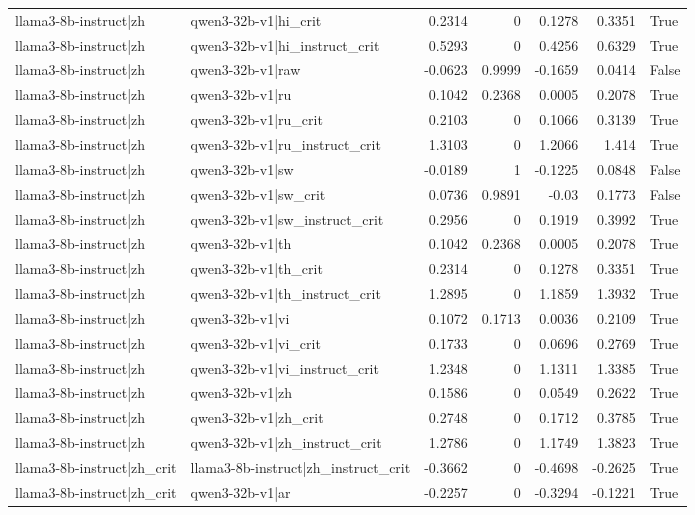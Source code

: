 \begin{table}
\begin{tabular}{l l r r r r l}
llama3-8b-instruct|zh & qwen3-32b-v1|hi_crit & 0.2314 & 0 & 0.1278 & 0.3351 & True \\
llama3-8b-instruct|zh & qwen3-32b-v1|hi_instruct_crit & 0.5293 & 0 & 0.4256 & 0.6329 & True \\
llama3-8b-instruct|zh & qwen3-32b-v1|raw & -0.0623 & 0.9999 & -0.1659 & 0.0414 & False \\
llama3-8b-instruct|zh & qwen3-32b-v1|ru & 0.1042 & 0.2368 & 0.0005 & 0.2078 & True \\
llama3-8b-instruct|zh & qwen3-32b-v1|ru_crit & 0.2103 & 0 & 0.1066 & 0.3139 & True \\
llama3-8b-instruct|zh & qwen3-32b-v1|ru_instruct_crit & 1.3103 & 0 & 1.2066 & 1.414 & True \\
llama3-8b-instruct|zh & qwen3-32b-v1|sw & -0.0189 & 1 & -0.1225 & 0.0848 & False \\
llama3-8b-instruct|zh & qwen3-32b-v1|sw_crit & 0.0736 & 0.9891 & -0.03 & 0.1773 & False \\
llama3-8b-instruct|zh & qwen3-32b-v1|sw_instruct_crit & 0.2956 & 0 & 0.1919 & 0.3992 & True \\
llama3-8b-instruct|zh & qwen3-32b-v1|th & 0.1042 & 0.2368 & 0.0005 & 0.2078 & True \\
llama3-8b-instruct|zh & qwen3-32b-v1|th_crit & 0.2314 & 0 & 0.1278 & 0.3351 & True \\
llama3-8b-instruct|zh & qwen3-32b-v1|th_instruct_crit & 1.2895 & 0 & 1.1859 & 1.3932 & True \\
llama3-8b-instruct|zh & qwen3-32b-v1|vi & 0.1072 & 0.1713 & 0.0036 & 0.2109 & True \\
llama3-8b-instruct|zh & qwen3-32b-v1|vi_crit & 0.1733 & 0 & 0.0696 & 0.2769 & True \\
llama3-8b-instruct|zh & qwen3-32b-v1|vi_instruct_crit & 1.2348 & 0 & 1.1311 & 1.3385 & True \\
llama3-8b-instruct|zh & qwen3-32b-v1|zh & 0.1586 & 0 & 0.0549 & 0.2622 & True \\
llama3-8b-instruct|zh & qwen3-32b-v1|zh_crit & 0.2748 & 0 & 0.1712 & 0.3785 & True \\
llama3-8b-instruct|zh & qwen3-32b-v1|zh_instruct_crit & 1.2786 & 0 & 1.1749 & 1.3823 & True \\
llama3-8b-instruct|zh_crit & llama3-8b-instruct|zh_instruct_crit & -0.3662 & 0 & -0.4698 & -0.2625 & True \\
llama3-8b-instruct|zh_crit & qwen3-32b-v1|ar & -0.2257 & 0 & -0.3294 & -0.1221 & True \\

\end{tabular}
\end{table}
